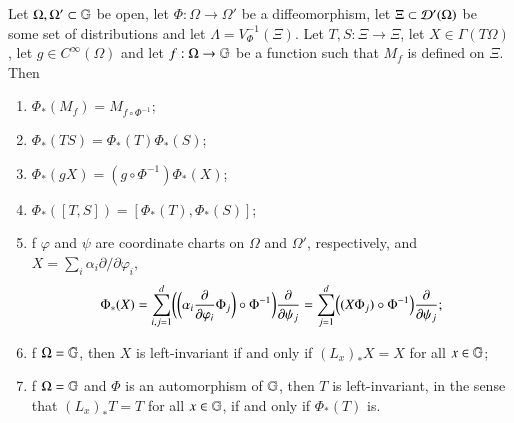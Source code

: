\documentclass[leqno]{amsart}
\begin{document}
	\begin{proposition}\label{pffacts}
		Let $\Omega,\Omega'\subset\mathbb{G}$ be open, let $\Phi:\Omega\to\Omega'$ be a diffeomorphism, let $\Xi\subset{\mathcal D}'(\Omega)$ be some set of distributions and let $\Lambda=V_{\Phi}^{-1}(\Xi)$. Let $T,S:\Xi\to \Xi$, let $X\in\Gamma(T\Omega)$, let $g\in C^\infty(\Omega)$ and let $f:\Omega\to\mathbb{G}$ be a function such that $M_f$ is defined on $\Xi$. Then
		\begin{enumerate}
			\item\label{pfmultiplier} $\Phi_*(M_f)=M_{f\circ\Phi^{-1}}$;
			\item\label{pfhomo} $\Phi_*(TS)=\Phi_*(T)\Phi_*(S)$;
			\item\label{pffunc} $\Phi_*(gX)=(g\circ\Phi^{-1})\Phi_*(X)$;
			\item\label{pfbracket} $\Phi_*([T, S])=[\Phi_*(T), \Phi_*(S)]$;
			\item\label{pfvectorcoord} f $\varphi$ and $\psi$ are coordinate charts on $\Omega$ and $\Omega'$, respectively, and $X=\sum_i\alpha_i\partial/\partial\varphi_i$,
			$$\Phi_*(X)=\sum_{i,j=1}^d \biggl(\biggl(\alpha_i\frac{\partial}{\partial\varphi_i}\Phi_j\biggr)\circ \Phi^{-1}\biggr)\frac{\partial}{\partial \psi_j}=\sum_{j=1}^d \Bigl((X\Phi_j)\circ \Phi^{-1}\Bigr)\frac{\partial}{\partial \psi_j};$$
			\item\label{pfleftinvariant} f $\Omega=\mathbb{G}$, then $X$ is left-invariant if and only if $(L_x)_*X=X$ for all $x\in\mathbb{G}$;
			\item\label{pfleftinvariantauto} f $\Omega=\mathbb{G}$ and $\Phi$ is an automorphism of $\mathbb{G}$, then $T$ is left-invariant, in the sense that $(L_x)_*T=T$ for all $x\in\mathbb{G}$, if and only if $\Phi_*(T)$ is.
		\end{enumerate}
	\end{proposition}
\end{document}

